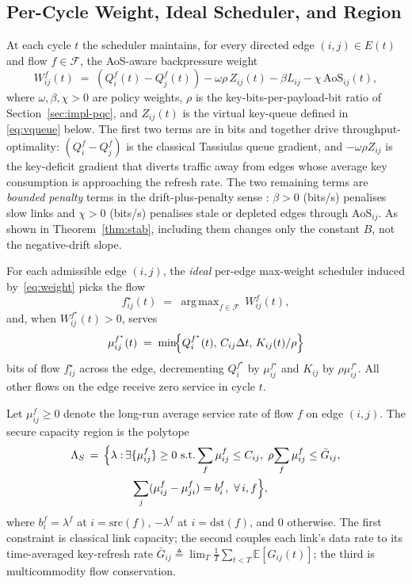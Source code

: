 \documentclass[conference]{IEEEtran}
\DeclareMathOperator*{\argmax}{arg\,max}
\begin{document}
\subsection{Per-Cycle Weight, Ideal Scheduler, and Region}

At each cycle $t$ the scheduler maintains, for every directed edge
$(i,j)\in E(t)$ and flow $f\in\mathcal{F}$, the AoS-aware
backpressure weight
\begin{equation}
W^f_{ij}(t)
 \;=\; (Q^f_i(t)-Q^f_j(t))
       - \omega\rho\,Z_{ij}(t)
       - \beta L_{ij}
       - \chi\,\mathrm{AoS}_{ij}(t),
\label{eq:weight}
\end{equation}
where $\omega,\beta,\chi>0$ are policy weights, $\rho$ is the
key-bits-per-payload-bit ratio of Section~\ref{sec:impl-pqc}, and
$Z_{ij}(t)$ is the virtual key-queue defined in
\eqref{eq:vqueue} below.  The first two terms are in bits and
together drive throughput-optimality: $(Q^f_i\!-\!Q^f_j)$ is the
classical Tassiulas queue gradient, and $-\omega\rho Z_{ij}$ is the
key-deficit gradient that diverts traffic away from edges whose
average key consumption is approaching the refresh rate.  The two
remaining terms are \emph{bounded penalty} terms in the
drift-plus-penalty sense \cite[Sec.~4.5]{neely_book_2010}: $\beta>0$
(bits/s) penalises slow links and $\chi>0$ (bits/s) penalises stale
or depleted edges through $\mathrm{AoS}_{ij}$.  As shown in
Theorem~\ref{thm:stab}, including them changes only the constant
$B$, not the negative-drift slope.

For each admissible edge $(i,j)$, the \emph{ideal} per-edge
max-weight scheduler induced by~\eqref{eq:weight} picks the flow
\begin{equation}
f^\star_{ij}(t)\;=\;\argmax_{f\in\mathcal{F}}\,W^f_{ij}(t),
\label{eq:fstar}
\end{equation}
and, when $W^{f^\star}_{ij}(t)>0$, serves
\begin{equation*}
\mu^{f^\star}_{ij}(t)
 \;=\; \min\!\Bigl\{Q^{f^\star}_i(t),\,C_{ij}\Delta t,\,
                   K_{ij}(t)/\rho\Bigr\}
\end{equation*}
bits of flow $f^\star_{ij}$ across the edge, decrementing
$Q^{f^\star}_i$ by $\mu^{f^\star}_{ij}$ and $K_{ij}$ by
$\rho\mu^{f^\star}_{ij}$.  All other flows on the edge receive
zero service in cycle $t$.

Let $\mu^f_{ij}\ge 0$ denote the long-run average service rate of
flow $f$ on edge $(i,j)$.  The secure capacity region is the
polytope
\begin{align}
\Lambda_S \,=\,\Bigl\{\lambda:\,&\exists\{\mu^f_{ij}\}\ge 0\text{ s.t.}
  \sum_f\mu^f_{ij}\le C_{ij},\;
  \rho\!\sum_f\mu^f_{ij}\le\bar G_{ij},\nonumber\\
  &\;\;\sum_j(\mu^f_{ij}-\mu^f_{ji}) = b^f_i,\ \forall\,i,f\Bigr\},
\label{eq:lambdaS}
\end{align}
where $b^f_i=\lambda^f$ at $i=\mathrm{src}(f)$, $-\lambda^f$ at
$i=\mathrm{dst}(f)$, and $0$ otherwise.  The first constraint is
classical link capacity; the second couples each link's data rate to
its time-averaged key-refresh rate
$\bar G_{ij}\!\triangleq\!\lim_T\!\tfrac{1}{T}\!\sum_{t<T}\!\mathbb{E}[G_{ij}(t)]$;
the third is multicommodity flow conservation.
\end{document}
